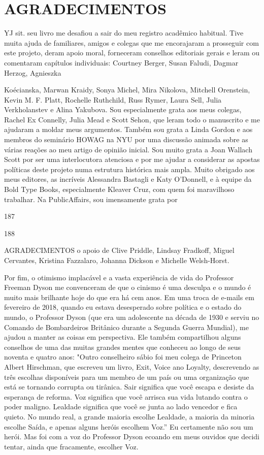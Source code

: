 \chapter{AGRADECIMENTOS}\label{AGRADECIMENTOS}
 \par 
YJ sit. seu livro me desafiou a sair do meu registro acadêmico habitual. Tive muita ajuda de familiares, amigos e colegas que me encorajaram a prosseguir com este projeto, deram apoio moral, forneceram conselhos editoriais gerais e leram ou comentaram capítulos individuais: Courtney Berger, Susan Faludi, Dagmar Herzog, Agnieszka
 \par 
Koécianska, Marwan Kraidy, Sonya Michel, Mira Nikolova, Mitchell Orenstein, Kevin M. F. Platt, Rochelle Ruthchild, Russ Rymer, Laura Sell, Julia Verkholanstev e Alina Yakubova. Sou especialmente grata aos meus colegas, Rachel Ex Connelly, Julia Mead e Scott Sehon, que leram todo o manuscrito e me ajudaram a moldar meus argumentos. Também sou grata a Linda Gordon e aos membros do seminário HOWAG na NYU por uma discussão animada sobre as várias reações ao meu artigo de opinião inicial. Sou muito grata a Joan Wallach Scott por ser uma interlocutora atenciosa e por me ajudar a considerar as apostas políticas deste projeto numa estrutura histórica mais ampla. Muito obrigado aos meus editores, as incríveis Alessandra Bastagli e Katy O'Donnell, e à equipe da Bold Type Books, especialmente Kleaver Cruz, com quem foi maravilhoso trabalhar. Na PublicAffairs, sou imensamente grata por
 \par 
187
 \par 
188
 \par 
AGRADECIMENTOS o apoio de Clive Priddle, Lindsay Fradkoff, Miguel Cervantes, Kristina Fazzalaro, Johanna Dickson e Michelle Welsh-Horst.
 \par 
Por fim, o otimismo implacável e a vasta experiência de vida do Professor Freeman Dyson me convenceram de que o cinismo é uma desculpa e o mundo é muito mais brilhante hoje do que era há cem anos. Em uma troca de e-mails em fevereiro de 2018, quando eu estava desesperado sobre política e o estado do mundo, o Professor Dyson (que era um adolescente na década de 1930 e serviu no Comando de Bombardeiros Britânico durante a Segunda Guerra Mundial), me ajudou a manter as coisas em perspectiva. Ele também compartilhou alguns conselhos de uma das muitas grandes mentes que conheceu ao longo de seus noventa e quatro anos: "Outro conselheiro sábio foi meu colega de Princeton Albert Hirschman, que escreveu um livro, Exit, Voice ano Loyalty, descrevendo as três escolhas disponíveis para um membro de um país ou uma organização que está se tornando corrupta ou tirânica. Sair significa que você escapa e desiste da esperança de reforma. Voz significa que você arrisca sua vida lutando contra o poder maligno. Lealdade significa que você se junta ao lado vencedor e fica quieto. No mundo real, a grande maioria escolhe Lealdade, a maioria da minoria escolhe Saída, e apenas alguns heróis escolhem Voz.” Eu certamente não sou um herói. Mas foi com a voz do Professor Dyson ecoando em meus ouvidos que decidi tentar, ainda que fracamente, escolher Voz.
 \par 
